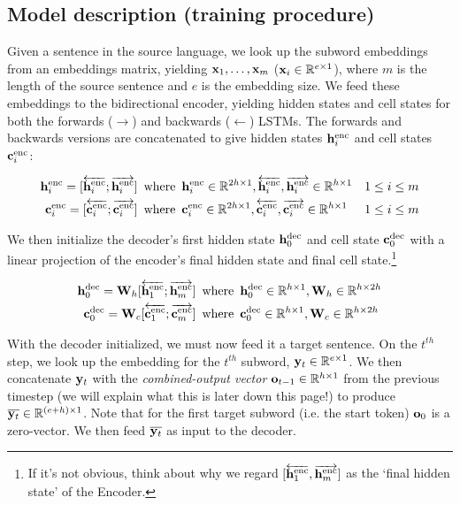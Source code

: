 \subsection*{Model description (training procedure)}
 Given a sentence in the source language, we look up the subword embeddings from an embeddings matrix, yielding $\mathbf{x}_1, \dots, \mathbf{x}_m$ ($\mathbf{x}_i \in \mathbb{R}^{e \times 1}$), where $m$ is the length of the source sentence and $e$ is the embedding size. We feed these embeddings to the bidirectional encoder, yielding hidden states and cell states for both the forwards ($\rightarrow$) and backwards ($\leftarrow$) LSTMs. The forwards and backwards versions are concatenated to give hidden states $\mathbf{h}^{\text{enc}}_i$ and cell states $\mathbf{c}^{\text{enc}}_i$:
 
\begin{align}
    \mathbf{h}^{\text{enc}}_i = [\overleftarrow{\mathbf{h}^{\text{enc}}_{i}}; \overrightarrow{\mathbf{h}^{\text{enc}}_{i}}] \enspace &\text{where}\enspace \mathbf{h}^{\text{enc}}_i \in \mathbb{R}^{2h \times 1}, \overleftarrow{\mathbf{h}^{\text{enc}}_{i}}, \overrightarrow{\mathbf{h}^{\text{enc}}_{i}} \in \mathbb{R}^{h \times 1} &1 \le i \le m \\
    \mathbf{c}^{\text{enc}}_i = [\overleftarrow{\mathbf{c}^{\text{enc}}_{i}}; \overrightarrow{\mathbf{c}^{\text{enc}}_{i}}] \enspace &\text{where} \enspace \mathbf{c}^{\text{enc}}_i \in \mathbb{R}^{2h \times 1}, \overleftarrow{\mathbf{c}^{\text{enc}}_{i}}, \overrightarrow{\mathbf{c}^{\text{enc}}_{i}} \in \mathbb{R}^{h \times 1} &1 \le i \le m
\end{align}

We then initialize the decoder's first hidden state $\mathbf{h}^{\text{dec}}_0$ and cell state $\mathbf{c}^{\text{dec}}_0$ with a linear projection of the encoder's final hidden state and final cell state.\footnote{If it's not obvious, think about why we regard $[\overleftarrow{\mathbf{h}^{\text{enc}}_{1}}, \overrightarrow{\mathbf{h}^{\text{enc}}_{m}}]$ as the `final hidden state' of the Encoder.} 

\begin{align}
    \mathbf{h}^{\text{dec}}_0 = \mathbf{W}_{h}[\overleftarrow{\mathbf{h}^{\text{enc}}_{1}}; \overrightarrow{\mathbf{h}^{\text{enc}}_{m}}] \enspace &\text{where} \enspace \mathbf{h}^{\text{dec}}_0 \in \mathbb{R}^{h \times 1}, \mathbf{W}_{h} \in \mathbb{R}^{h \times 2h}\\
    \mathbf{c}^{\text{dec}}_0 = \mathbf{W}_{c}[\overleftarrow{\mathbf{c}^{\text{enc}}_{1}}; \overrightarrow{\mathbf{c}^{\text{enc}}_{m}}] \enspace &\text{where} \enspace \mathbf{c}^{\text{dec}}_0 \in \mathbb{R}^{h \times 1}, \mathbf{W}_{c} \in \mathbb{R}^{h \times 2h}
\end{align}

With the decoder initialized, we must now feed it a target sentence. On the $t^{th}$ step, we look up the embedding for the $t^{th}$ subword,  $\mathbf{y}_t \in \mathbb{R}^{e \times 1}$. We then concatenate $\mathbf{y}_t$ with the \textit{combined-output vector} $\mathbf{o}_{t-1} \in \mathbb{R}^{h \times 1}$ from the previous timestep (we will explain what this is later down this page!\@) to produce $\overline{\mathbf{y}_t} \in \mathbb{R}^{(e+h) \times 1}$. Note that for the first target subword (i.e. the start token) $\mathbf{o}_{0}$ is a zero-vector. We then feed $\overline{\mathbf{y}_t}$ as input to the decoder. 

